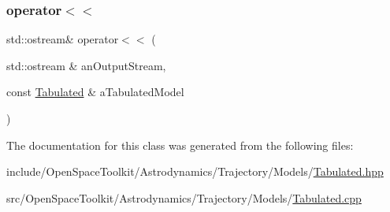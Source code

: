 \subsubsection{\texorpdfstring{operator$<$$<$}{operator<<}}
{\footnotesize\ttfamily std\+::ostream\& operator$<$$<$ (\begin{DoxyParamCaption}\item[{std\+::ostream \&}]{an\+Output\+Stream,  }\item[{const \hyperlink{classostk_1_1astro_1_1trajectory_1_1models_1_1_tabulated}{Tabulated} \&}]{a\+Tabulated\+Model }\end{DoxyParamCaption})\hspace{0.3cm}{\ttfamily [friend]}}



The documentation for this class was generated from the following files\+:\begin{DoxyCompactItemize}
\item 
include/\+Open\+Space\+Toolkit/\+Astrodynamics/\+Trajectory/\+Models/\hyperlink{_trajectory_2_models_2_tabulated_8hpp}{Tabulated.\+hpp}\item 
src/\+Open\+Space\+Toolkit/\+Astrodynamics/\+Trajectory/\+Models/\hyperlink{_trajectory_2_models_2_tabulated_8cpp}{Tabulated.\+cpp}\end{DoxyCompactItemize}

